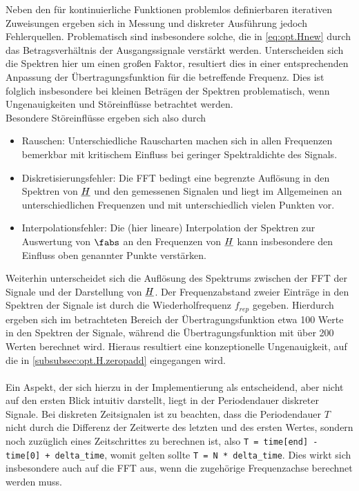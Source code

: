 \documentclass[../Report.tex]{subfiles}
\begin{document}
Neben den für kontinuierliche Funktionen problemlos definierbaren iterativen Zuweisungen ergeben sich in Messung und diskreter Ausführung jedoch Fehlerquellen. Problematisch sind insbesondere solche, die in \eqref{eq:opt.Hnew} durch das Betragsverhältnis der Ausgangssignale verstärkt werden. 
Unterscheiden sich die Spektren hier um einen großen Faktor, resultiert dies in einer entsprechenden Anpassung der Übertragungsfunktion für die betreffende Frequenz. Dies ist folglich insbesondere bei kleinen Beträgen der Spektren problematisch, wenn Ungenauigkeiten und Störeinflüsse betrachtet werden. 
\\
Besondere Störeinflüsse ergeben sich also durch
\begin{itemize}
	\item Rauschen: Unterschiedliche Rauscharten machen sich in allen Frequenzen bemerkbar mit kritischem Einfluss bei geringer Spektraldichte des Signals.\cite[S. 205 ff.]{lerch10}
	
	\item Diskretisierungsfehler: Die FFT bedingt eine begrenzte Auflösung in den Spektren von $\underline{H}$ und den gemessenen Signalen und liegt im Allgemeinen an unterschiedlichen Frequenzen und mit unterschiedlich vielen Punkten vor.
	
	\item Interpolationsfehler: Die (hier lineare) Interpolation der Spektren zur Auswertung von $\fabs$ an den Frequenzen von $\underline{H}$ kann insbesondere den Einfluss oben genannter Punkte verstärken.
\end{itemize}

\noindent
Weiterhin unterscheidet sich die Auflösung des Spektrums zwischen der FFT der Signale und der Darstellung von $\underline{H}$. Der Frequenzabstand zweier Einträge in den Spektren der Signale ist durch die Wiederholfrequenz $f_{rep}$ gegeben. Hierdurch ergeben sich im betrachteten Bereich der Übertragungsfunktion etwa 100 Werte in den Spektren der Signale, während die Übertragungsfunktion mit über 200 Werten berechnet wird. Hieraus resultiert eine konzeptionelle Ungenauigkeit, auf die in \ref{subsubsec:opt.H.zeropadd} eingegangen wird. 
\\
\\
Ein Aspekt, der sich hierzu in der Implementierung als entscheidend, aber nicht auf den ersten Blick intuitiv darstellt, liegt in der Periodendauer diskreter Signale. Bei diskreten Zeitsignalen ist zu beachten, dass die Periodendauer $T$ nicht durch die Differenz der Zeitwerte des letzten und des ersten Wertes, sondern noch zuzüglich eines Zeitschrittes  zu berechnen ist, also \lstinline{T = time[end] - time[0] + delta_time}, womit gelten sollte \lstinline{T = N * delta_time}. Dies wirkt sich insbesondere auch auf die FFT aus, wenn die zugehörige Frequenzachse berechnet werden muss.
\\
\\
\end{document}
